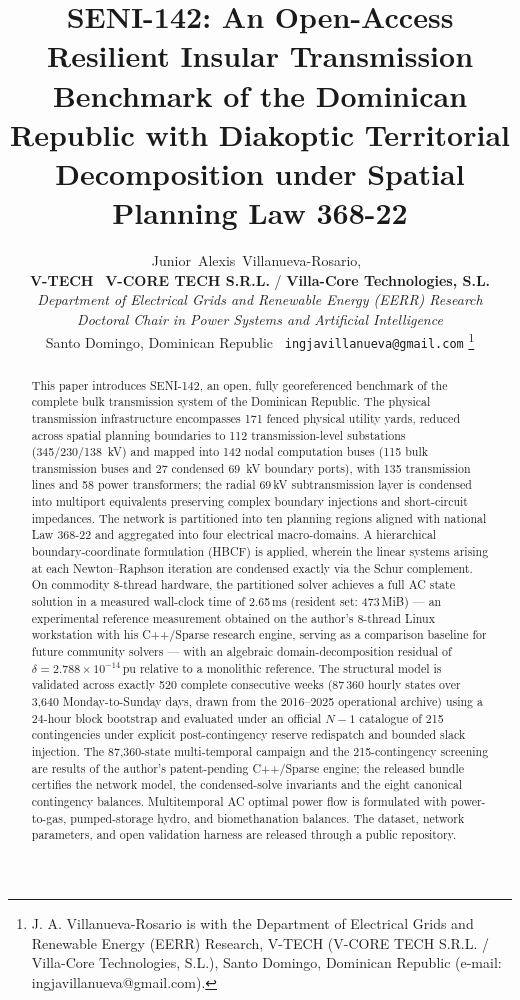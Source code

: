 \documentclass[11pt, journal, onecolumn]{IEEEtran}
\title{SENI-142: An Open-Access Resilient Insular Transmission Benchmark of the Dominican Republic with Diakoptic Territorial Decomposition under Spatial Planning Law 368-22}
\author{Junior~Alexis~Villanueva-Rosario,~\IEEEmembership{Ms.C., Ph.D.(c)}\\[0.3em]
{\normalsize\textnormal{\textbf{V-TECH} \textbar\ \textbf{V-CORE TECH S.R.L.} / \textbf{Villa-Core Technologies, S.L.}}}\\[0.15em]
{\footnotesize\textnormal{\textit{Department of Electrical Grids and Renewable Energy (EERR) Research}}}\\[0.15em]
{\footnotesize\textnormal{\textit{Doctoral Chair in Power Systems and Artificial Intelligence}}}\\[0.15em]
{\footnotesize\textnormal{Santo Domingo, Dominican Republic \textbar\ \texttt{ingjavillanueva@gmail.com}}}%
\thanks{J. A. Villanueva-Rosario is with the Department of Electrical Grids and Renewable Energy (EERR) Research, V-TECH (V-CORE TECH S.R.L. / Villa-Core Technologies, S.L.), Santo Domingo, Dominican Republic (e-mail: ingjavillanueva@gmail.com).}}
\begin{document}
\maketitle

\begin{abstract}
This paper introduces SENI-142, an open, fully georeferenced benchmark of the complete bulk transmission system of the Dominican Republic. The physical transmission infrastructure encompasses 171 fenced physical utility yards, reduced across spatial planning boundaries to 112 transmission-level substations (345/230/138~kV) and mapped into 142 nodal computation buses (115 bulk transmission buses and 27 condensed 69~kV boundary ports), with 135 transmission lines and 58 power transformers; the radial 69\,kV subtransmission layer is condensed into multiport equivalents preserving complex boundary injections and short-circuit impedances. The network is partitioned into ten planning regions aligned with national Law 368-22 and aggregated into four electrical macro-domains. A hierarchical boundary-coordinate formulation (HBCF) is applied, wherein the linear systems arising at each Newton--Raphson iteration are condensed exactly via the Schur complement. On commodity 8-thread hardware, the partitioned solver achieves a full AC state solution in a measured wall-clock time of 2.65\,ms (resident set: 473\,MiB) --- an experimental reference measurement obtained on the author's 8-thread Linux workstation with his C++/Sparse research engine, serving as a comparison baseline for future community solvers --- with an algebraic domain-decomposition residual of $\delta = 2.788 \times 10^{-14}$\,pu relative to a monolithic reference. The structural model is validated across exactly 520 complete consecutive weeks (87\,360 hourly states over 3,640 Monday-to-Sunday days, drawn from the 2016--2025 operational archive) using a 24-hour block bootstrap and evaluated under an official $N-1$ catalogue of 215 contingencies under explicit post-contingency reserve redispatch and bounded slack injection. The 87,360-state multi-temporal campaign and the 215-contingency screening are results of the author's patent-pending C++/Sparse engine; the released bundle certifies the network model, the condensed-solve invariants and the eight canonical contingency balances. Multitemporal AC optimal power flow is formulated with power-to-gas, pumped-storage hydro, and biomethanation balances. The dataset, network parameters, and open validation harness are released through a public repository.
\end{abstract}
\end{document}
